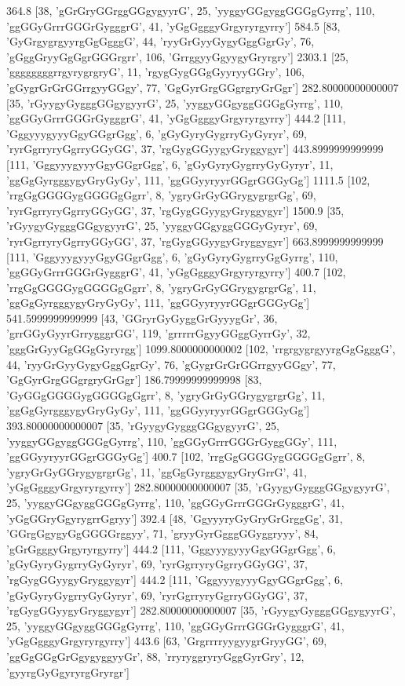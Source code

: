 364.8 [38, 'gGrGryGGrggGGgygyyrG', 25, 'yyggyGGgyggGGGgGyrrg', 110, 'ggGGyGrrrGGGrGygggrG', 41, 'yGgGgggyGrgyryrgyrry']
584.5 [83, 'GyGrgygrgyyrgGgGgggG', 44, 'ryyGrGyyGygyGggGgrGy', 76, 'gGggGryyGgGgrGGGrgrr', 106, 'GrrggyyGgyygyGryrgry']
2303.1 [25, 'ggggggggrrgyrygrgryG', 11, 'rgygGygGGgGyyryyGGry', 106, 'gGygrGrGrGGrrgyyGGgy', 77, 'GgGyrGrgGGgrgryGrGgr']
282.80000000000007 [35, 'rGyygyGygggGGgygyyrG', 25, 'yyggyGGgyggGGGgGyrrg', 110, 'ggGGyGrrrGGGrGygggrG', 41, 'yGgGgggyGrgyryrgyrry']
444.2 [111, 'GggyyygyyyGgyGGgrGgg', 6, 'gGyGyryGygrryGyGyryr', 69, 'ryrGgrryryGgrryGGyGG', 37, 'rgGygGGyygyGryggygyr']
443.8999999999999 [111, 'GggyyygyyyGgyGGgrGgg', 6, 'gGyGyryGygrryGyGyryr', 11, 'ggGgGyrgggygyGryGyGy', 111, 'ggGGyyryyrGGgrGGGyGg']
1111.5 [102, 'rrgGgGGGGygGGGGgGgrr', 8, 'ygryGrGyGGrygygrgrGg', 69, 'ryrGgrryryGgrryGGyGG', 37, 'rgGygGGyygyGryggygyr']
1500.9 [35, 'rGyygyGygggGGgygyyrG', 25, 'yyggyGGgyggGGGyGyryr', 69, 'ryrGgrryryGgrryGGyGG', 37, 'rgGygGGyygyGryggygyr']
663.8999999999999 [111, 'GggyyygyyyGgyGGgrGgg', 6, 'gGyGyryGygrryGgGyrrg', 110, 'ggGGyGrrrGGGrGygggrG', 41, 'yGgGgggyGrgyryrgyrry']
400.7 [102, 'rrgGgGGGGygGGGGgGgrr', 8, 'ygryGrGyGGrygygrgrGg', 11, 'ggGgGyrgggygyGryGyGy', 111, 'ggGGyyryyrGGgrGGGyGg']
541.5999999999999 [43, 'GGryrGyGyggGrGyyygGr', 36, 'grrGGyGyyrGrrygggrGG', 119, 'grrrrrGgyyGGggGyrrGy', 32, 'gggGrGyyGgGGgGyryrgg']
1099.8000000000002 [102, 'rrgrgygrgyyrgGgGgggG', 44, 'ryyGrGyyGygyGggGgrGy', 76, 'gGygrGrGrGGrrgyyGGgy', 77, 'GgGyrGrgGGgrgryGrGgr']
186.79999999999998 [83, 'GyGGgGGGGygGGGGgGgrr', 8, 'ygryGrGyGGrygygrgrGg', 11, 'ggGgGyrgggygyGryGyGy', 111, 'ggGGyyryyrGGgrGGGyGg']
393.80000000000007 [35, 'rGyygyGygggGGgygyyrG', 25, 'yyggyGGgyggGGGgGyrrg', 110, 'ggGGyGrrrGGGrGyggGGy', 111, 'ggGGyyryyrGGgrGGGyGg']
400.7 [102, 'rrgGgGGGGygGGGGgGgrr', 8, 'ygryGrGyGGrygygrgrGg', 11, 'ggGgGyrgggygyGryGrrG', 41, 'yGgGgggyGrgyryrgyrry']
282.80000000000007 [35, 'rGyygyGygggGGgygyyrG', 25, 'yyggyGGgyggGGGgGyrrg', 110, 'ggGGyGrrrGGGrGygggrG', 41, 'yGgGGryGgyrygrrGgryy']
392.4 [48, 'GgyyyryGyGryGrGrggGg', 31, 'GGrgGgygyGgGGGGrggyy', 71, 'gryyGyrGgggGGyggryyy', 84, 'gGrGgggyGrgyryrgyrry']
444.2 [111, 'GggyyygyyyGgyGGgrGgg', 6, 'gGyGyryGygrryGyGyryr', 69, 'ryrGgrryryGgrryGGyGG', 37, 'rgGygGGyygyGryggygyr']
444.2 [111, 'GggyyygyyyGgyGGgrGgg', 6, 'gGyGyryGygrryGyGyryr', 69, 'ryrGgrryryGgrryGGyGG', 37, 'rgGygGGyygyGryggygyr']
282.80000000000007 [35, 'rGyygyGygggGGgygyyrG', 25, 'yyggyGGgyggGGGgGyrrg', 110, 'ggGGyGrrrGGGrGygggrG', 41, 'yGgGgggyGrgyryrgyrry']
443.6 [63, 'GrgrrrryygyygrGryyGG', 69, 'ggGgGGgGrGgygyggyyGr', 88, 'rryryggryryGggGyrGry', 12, 'gyyrgGyGgyryrgGryrgr']
